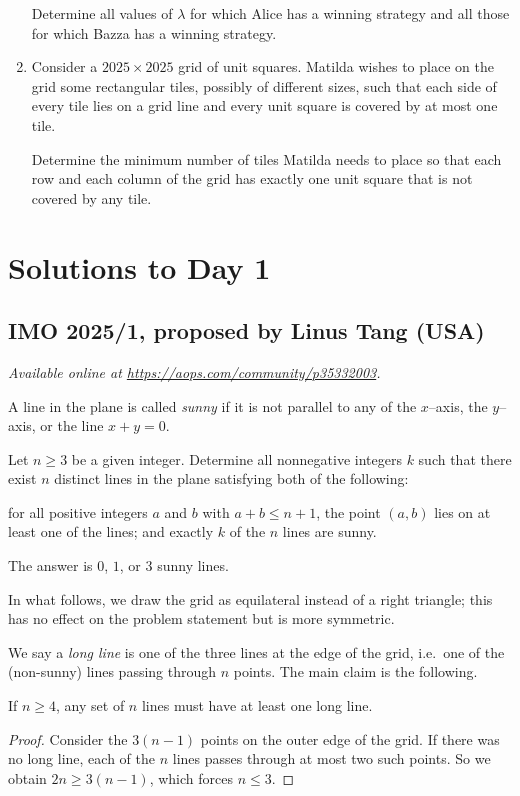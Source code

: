 \documentclass[11pt]{scrartcl}
\begin{document}
\begin{enumerate}[\bfseries 1.]
Determine all values of $\lambda$ for which Alice has a winning strategy
and all those for which Bazza has a winning strategy.

\item %
Consider a $2025 \times 2025$ grid of unit squares.
Matilda wishes to place on the grid some rectangular tiles, possibly of different sizes,
such that each side of every tile lies on a grid line
and every unit square is covered by at most one tile.

Determine the minimum number of tiles Matilda needs to place
so that each row and each column of the grid has exactly one unit square
that is not covered by any tile.

\end{enumerate}
\pagebreak

\section{Solutions to Day 1}
\subsection{IMO 2025/1, proposed by Linus Tang (USA)}
\textsl{Available online at \url{https://aops.com/community/p35332003}.}
\begin{mdframed}[style=mdpurplebox,frametitle={Problem statement}]
A line in the plane is called \emph{sunny}
if it is not parallel to any of the $x$–axis, the $y$–axis, or the line $x+y=0$.

Let $n \ge 3$ be a given integer.
Determine all nonnegative integers $k$ such that there exist $n$ distinct lines
in the plane satisfying both of the following:
\begin{itemize}
\ii for all positive integers $a$ and $b$ with $a+b\le n+1$,
  the point $(a,b)$ lies on at least one of the lines; and
\ii exactly $k$ of the $n$ lines are sunny.
\end{itemize}
\end{mdframed}
The answer is $0$, $1$, or $3$ sunny lines.

In what follows, we draw the grid as equilateral instead of a right triangle;
this has no effect on the problem statement but is more symmetric.

We say a \emph{long line} is one of the three lines at the edge of the grid,
i.e.\ one of the (non-sunny) lines passing through $n$ points.
The main claim is the following.
\begin{claim*}
  If $n \ge 4$, any set of $n$ lines must have at least one long line.
\end{claim*}
\begin{proof}
  Consider the $3(n-1)$ points on the outer edge of the grid.
  If there was no long line, each of the $n$ lines passes through at most two such points.
  So we obtain $2n \ge 3(n-1)$, which forces $n \le 3$.
\end{proof}
\end{document}
